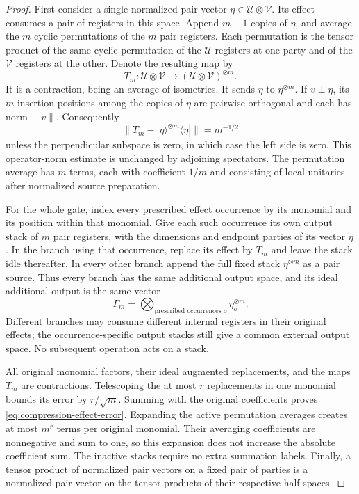 \documentclass[11pt]{article}
\numberwithin{equation}{section}
\theoremstyle{definition}
\theoremstyle{remark}
\newcommand{\norm}[1]{\lVert #1\rVert}
\begin{document}
\begin{proof}
First consider a single normalized pair vector
$\eta\in\mathcal U\otimes\mathcal V$.  Its effect consumes a pair of
registers in this space.  Append $m-1$ copies of $\eta$, and average the
$m$ cyclic permutations of the $m$ pair registers.  Each permutation is
the tensor product of the same cyclic permutation of the $\mathcal U$
registers at one party and of the $\mathcal V$ registers at the other.
Denote the resulting map by
\[
 T_m:\mathcal U\otimes\mathcal V
       \longrightarrow(\mathcal U\otimes\mathcal V)^{\otimes m}.
\]
It is a contraction, being an average of isometries.  It sends $\eta$ to
$\eta^{\otimes m}$.  If $v\perp\eta$, its $m$ insertion positions among
the copies of $\eta$ are pairwise orthogonal and each has norm
$\norm{v}$.  Consequently
\begin{equation}
 \norm{T_m-|\eta\rangle^{\otimes m}\langle\eta|}
       =m^{-1/2}
 \label{eq:compression-one-effect}
\end{equation}
unless the perpendicular subspace is zero, in which case the left side
is zero.  This operator-norm estimate is unchanged by adjoining
spectators.  The permutation average has $m$ terms, each with coefficient
$1/m$ and consisting of local unitaries after normalized source
preparation.

For the whole gate, index every prescribed effect occurrence by its
monomial and its position within that monomial.  Give each such
occurrence its own output stack of $m$ pair registers, with the dimensions
and endpoint parties of its vector $\eta$.  In the branch using that
occurrence, replace its effect by $T_m$ and leave the stack idle
thereafter.  In every other branch append the full fixed stack
$\eta^{\otimes m}$ as a pair source.  Thus every branch has the same
additional output space, and its ideal additional output is the same
vector
\[
 \Gamma_m=\bigotimes_{\text{prescribed occurrences }o}
                    \eta_o^{\otimes m}.
\]
Different branches may consume different internal registers in their
original effects; the occurrence-specific output stacks still give a
common external output space.  No subsequent operation acts on a stack.

All original monomial factors, their ideal augmented replacements, and
the maps $T_m$ are contractions.  Telescoping the at most $r$ replacements
in one monomial bounds its error by $r/\sqrt m$.  Summing with the
original coefficients proves
\eqref{eq:compression-effect-error}.  Expanding the active permutation
averages creates at most $m^r$ terms per original monomial.  Their
averaging coefficients are nonnegative and sum to one, so this expansion
does not increase the absolute coefficient sum.  The inactive stacks
require no extra summation labels.  Finally, a tensor product of
normalized pair vectors on a fixed pair of parties is a normalized pair
vector on the tensor products of their respective half-spaces.
\end{proof}
\end{document}
